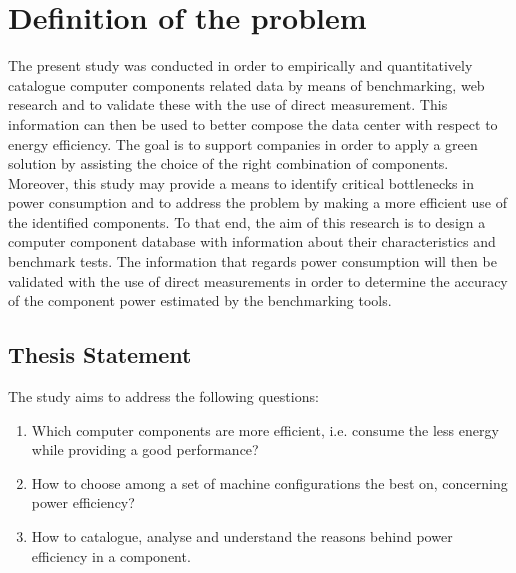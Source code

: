 


\section{Definition of the problem} \label{sec1:problem}
    
    The present study was conducted in order to empirically and quantitatively catalogue computer components related data by means of benchmarking, web research and to validate these with the use of direct measurement. This information can then be used to better compose the data center with respect to energy efficiency. The goal is to support companies in order to apply a green solution by assisting the choice of the right combination of components.
    Moreover, this study may provide a means to identify critical bottlenecks in power consumption and to address the problem by making a more efficient use of the identified components. To that end, the aim of this research is to design a computer component database with information about their characteristics and benchmark tests. The information that regards power consumption will then be validated with the use of direct measurements in order to determine the accuracy of the component power estimated by the benchmarking tools.
    
    \subsection{Thesis Statement}\label{sec1:thesis_statement}
        The study aims to address the following questions:
        \begin{enumerate}
	        \item Which computer components are more efficient, i.e. consume the less energy while providing a good performance?
	        \item How to choose among a set of machine configurations the best on, concerning power efficiency?
	        \item How to catalogue, analyse and understand the reasons behind power efficiency in a component.
        \end{enumerate}
        
